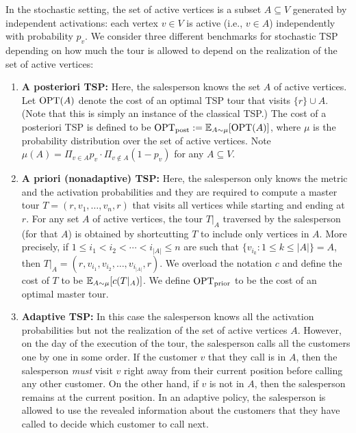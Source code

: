 \documentclass[12pt]{amsart}
\begin{document}
In the stochastic setting, the set of active vertices is a subset $A \subseteq V$ generated by independent activations: each vertex $v \in V$ is active (i.e., $v \in A$) independently with probability $p_v$.
% 
We consider three different benchmarks for stochastic TSP depending on how much the tour is allowed to depend on the realization of the set of active vertices:
\begin{enumerate}
    \item \textbf{A posteriori TSP:} %
        Here, the salesperson knows the set $A$ of active vertices. 
        Let $\operatorname{OPT}(A)$ denote the cost of an optimal TSP tour that visits $\{r\} \cup A$. (Note that this is simply an instance of the classical TSP.) 
        The cost of a posteriori TSP is defined to be 
        $\operatorname{OPT}_\mathrm{post} := \mathbb{E}_{A \sim \mu} [\operatorname{OPT}(A)]$, where $\mu$ is the probability distribution over the set of active vertices. 
        Note $\mu(A) = \Pi_{v \in A}p_v \cdot \Pi_{v \notin A}(1 - p_v)$ for any $A \subseteq V$.  
        
    \item \textbf{A priori (nonadaptive) TSP:} 
        Here, the salesperson only knows the metric and the activation probabilities and they are required to compute a master tour $T = (r, v_1,\ldots,v_n,r)$ that visits all vertices while starting and ending at $r$. 
        For any set $A$ of active vertices, the tour $T\vert_A$ traversed by the salesperson (for that $A$) is obtained by shortcutting $T$ to include only vertices in $A$. 
        More precisely, if $1 \leq i_1 < i_2 < \cdots < i_{|A|} \leq n$ are such that $\{v_{i_k} : 1 \leq k \leq |A|\} = A$, then $T\vert_A = (r,v_{i_1},v_{i_2},\ldots,v_{i_{|A|}},r)$.  
        We overload the notation $c$ and define the cost of $T$ to be $\mathbb{E}_{A \sim \mu} [c(T\vert_A)]$. 
        We define $\operatorname{OPT}_\mathrm{prior}$ to be the cost of an optimal master tour.  
        
    \item \textbf{Adaptive TSP:} 
        In this case the salesperson knows all the activation probabilities but not the realization of the set of active vertices $A$. 
        However, on the day of the execution of the tour, the salesperson calls all the customers one by one in some order. 
        If the customer $v$ that they call is in $A$, then the salesperson \emph{must} visit $v$ right away from their current position before calling any other customer. 
        On the other hand, if $v$ is not in $A$, then the salesperson remains at the current position. 
        In an adaptive policy, the salesperson is allowed to use the revealed information about the customers that they have called to decide which customer to call next.    
        

\end{enumerate}
\end{document}
